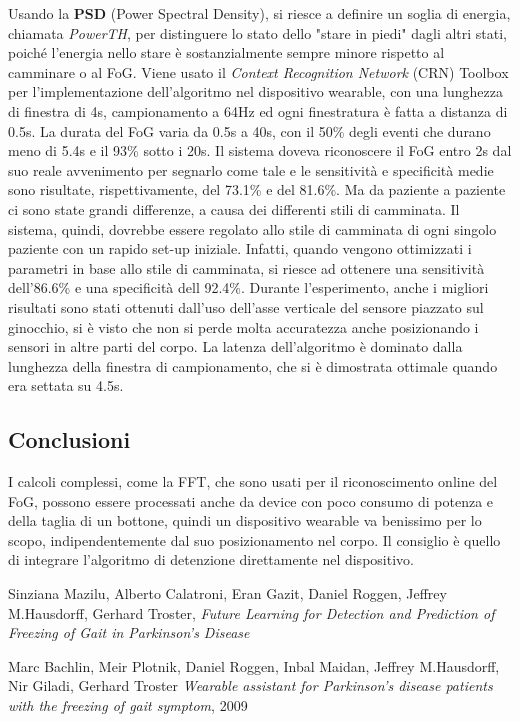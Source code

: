 \documentclass[a4paper,11pt]{article} %
\begin{document}
Usando la \textbf{PSD} (Power Spectral Density), si riesce a definire un soglia di energia, chiamata \textit{PowerTH}, per distinguere lo stato dello "stare in piedi" dagli altri stati, poiché l'energia nello stare è sostanzialmente sempre minore rispetto al camminare o al FoG. Viene usato il \textit{Context Recognition Network} (CRN) Toolbox per l'implementazione dell'algoritmo nel dispositivo wearable, con una lunghezza di finestra di 4s, campionamento a 64Hz ed ogni finestratura è fatta a distanza di 0.5s. La durata del FoG varia da 0.5s a 40s, con il 50\% degli eventi che durano meno di 5.4s e il 93\% sotto i 20s. Il sistema doveva riconoscere il FoG entro 2s dal suo reale avvenimento per segnarlo come tale e le sensitività e specificità medie sono risultate, rispettivamente, del 73.1\% e del 81.6\%. Ma da paziente a paziente ci sono state grandi differenze, a causa dei differenti stili di camminata. Il sistema, quindi, dovrebbe essere regolato allo stile di camminata di ogni singolo paziente con un rapido set-up iniziale. Infatti, quando vengono ottimizzati i parametri in base allo stile di camminata, si riesce ad ottenere una sensitività dell'86.6\% e una specificità dell 92.4\%.\linebreak
Durante l'esperimento, anche i migliori risultati sono stati ottenuti dall'uso dell'asse verticale del sensore piazzato sul ginocchio, si è visto che non si perde molta accuratezza anche posizionando i sensori in altre parti del corpo. La latenza dell'algoritmo è dominato dalla lunghezza della finestra di campionamento, che si è dimostrata ottimale quando era settata su 4.5s.
\subsection{Conclusioni}
I calcoli complessi, come la FFT, che sono usati per il riconoscimento online del FoG, possono essere processati anche da device con poco consumo di potenza e della taglia di un bottone, quindi un dispositivo wearable va benissimo per lo scopo, indipendentemente dal suo posizionamento nel corpo. Il consiglio è quello di integrare l'algoritmo di detenzione direttamente nel dispositivo.



\pagebreak

\begin{thebibliography}{9}
 Sinziana Mazilu, Alberto Calatroni, Eran Gazit, Daniel Roggen, Jeffrey M.Hausdorff, Gerhard Troster,  
\emph{Future Learning for Detection and Prediction of Freezing of Gait in Parkinson's Disease}


 Marc Bachlin, Meir Plotnik, Daniel Roggen, Inbal Maidan, Jeffrey M.Hausdorff, Nir Giladi, Gerhard Troster
\emph{Wearable assistant for Parkinson's disease patients with the freezing of gait symptom}, 2009
\end{thebibliography}
\end{document}
